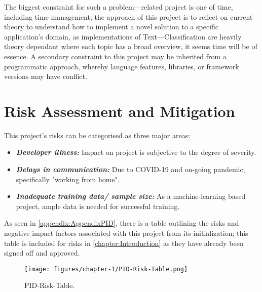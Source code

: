 The biggest constraint for such a problem---related project is one of time, including time management; the approach of this project is to reflect on current theory to understand how to implement a novel solution to a specific application’s domain, as implementations of Text---Classification are heavily theory dependant where each topic has a broad overview, it seems time will be of essence. A secondary constraint to this project may be inherited from a programmatic approach, whereby language features, libraries, or framework versions may have conflict.

\section{Risk Assessment and Mitigation}

This project's risks can be categorised as three major areas:

\begin{itemize}
	\item \textbf{\textit{Developer illness:}} Impact on project is subjective to the degree of severity.
	\item \textbf{\textit{Delays in communication:}} Due to COVID-19 and on-going pandemic, specifically "working from home".
	\item \textbf{\textit{Inadequate training data/ sample size:}} As a machine-learning based project, ample data is needed for successful training.
\end{itemize}

As seen in \autoref{appendix:AppendixPID}, there is a table outlining the risks and negative impact factors associated with this project from its initialization; this table is included for risks in \autoref{chapter:Introduction} as they have already been signed off and approved.

\begin{figure}[H]
    \centering
    \texttt{[image: figures/chapter-1/PID-Risk-Table.png]}
    \caption[PID-Risk-Table]{PID-Risk-Table.
    \label{fig:PID-Risk-Table}}
\end{figure}